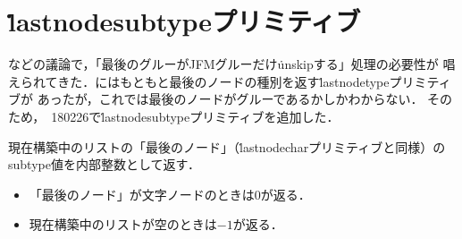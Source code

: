 \documentclass[a4paper,11pt,nomag]{jsarticle}
\begin{document}
\section{\.{lastnodesubtype}プリミティブ}
\cite{tjb28,plt63}などの議論で，「最後のグルーがJFMグルーだけ\.{unskip}する」処理の必要性が
唱えられてきた．\epTeX にはもともと最後のノードの種別を返す\.{lastnodetype}プリミティブが
あったが，これでは最後のノードがグルーであるかしかわからない．
そのため，\epTeX~180226で\.{lastnodesubtype}プリミティブを追加した．

\begin{cslist}
 現在構築中のリストの「最後のノード」（\.{lastnodechar}プリミティブと同様）の
 subtype値を内部整数として返す．
\begin{itemize}
 \item 「最後のノード」が文字ノードのときは0が返る．
 \item 現在構築中のリストが空のときは$-1$が返る．
\end{itemize}
\end{cslist}
\end{document}
